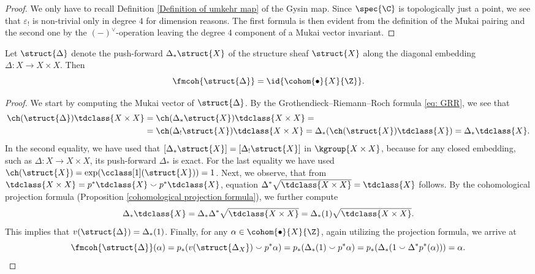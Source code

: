 \begin{proof}
    We only have to recall Definition \ref{Definition of umkehr map} of the Gysin map. Since $\spec{\C}$ is topologically just a point, we see that $\varepsilon_!$ is non-trivial only in degree $4$ for dimension reasons. The first formula is then evident from the definition of the Mukai pairing and the second one by the $(-)^\vee$-operation leaving the degree $4$ component of a Mukai vector invariant.
\end{proof}

\begin{lemma}
    \label{cohomological fm of diagonal}
    Let $\struct{\Delta}$ denote the push-forward $\Delta_*\struct{X}$ of the structure sheaf $\struct{X}$ along the diagonal embedding $\Delta \colon X \to X \times X$. Then
    \[
        \fmcoh{\struct{\Delta}} = \id{\cohom{\bullet}{X}{\Z}}.
    \]
\end{lemma}

\begin{proof}
    We start by computing the Mukai vector of $\struct{\Delta}$. By the Grothendieck--Rie\-mann--Roch formula \eqref{eq: GRR}, we see that
    \begin{align*}
        \ch(\struct{\Delta}) \tdclass{X \times X} &= \ch(\Delta_*\struct{X})\tdclass{X \times X} = \\ &= \ch(\Delta_!\struct{X})\tdclass{X \times X} = \Delta_*(\ch(\struct{X}) \tdclass{X}) = \Delta_*\tdclass{X}.
    \end{align*}
    In the second equality, we have used that $[\Delta_*\struct{X}] = [\Delta_!\struct{X}]$ in $\kgroup{X \times X}$, because for any closed embedding, such as $\Delta \colon X \to X \times X$, its push-forward $\Delta_*$ is exact. For the last equality we have used $\ch(\struct{X}) = \exp(\cclass[1](\struct{X})) = 1$. Next, we observe, that from $\tdclass{X \times X} = p^*\tdclass{X} \smallsmile p^*\tdclass{X}$, equation $\Delta^*\sqrt{\tdclass{X\times X}} = \tdclass{X}$ follows. By the cohomological projection formula (\cf Proposition \ref{cohomological projection formula}), we further compute
    \[
        \Delta_*\tdclass{X} = \Delta_*\Delta^*\sqrt{\tdclass{X \times X}} = \Delta_*(1)\sqrt{\tdclass{X \times X}}.
    \] 
    This implies that $v(\struct{\Delta}) = \Delta_*(1)$. 
    Finally, for any $\alpha \in \cohom{\bullet}{X}{\Z}$, again utilizing  the projection formula, we arrive at
    \[
        \fmcoh{\struct{\Delta}}(\alpha) = p_*(v(\struct{\Delta_X})\smallsmile p^*\alpha) = p_*(\Delta_*(1)\smallsmile p^*\alpha) = p_*(\Delta_*(1\smallsmile \Delta^*p^*(\alpha))) = \alpha. \qedhere
    \]
\end{proof}

